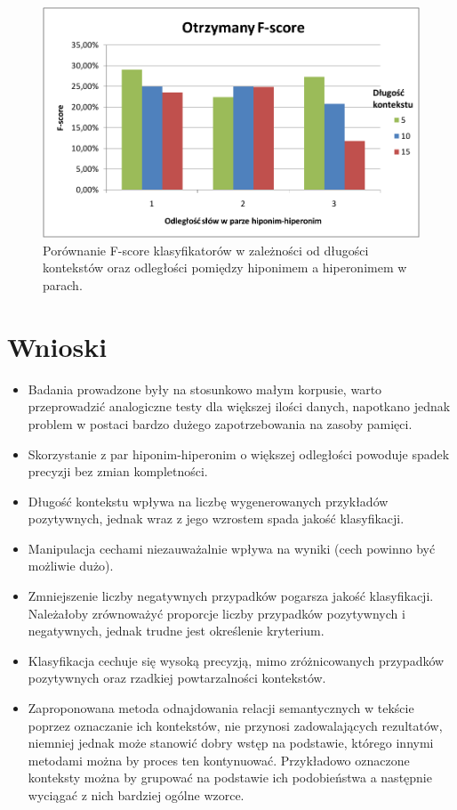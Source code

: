\documentclass[a4paper,10pt]{report}
\begin{document}
\begin{figure}[h]
\centering
 \includegraphics[width=13cm]{img/image001.png}
 \caption{Porównanie F-score klasyfikatorów w zależności od długości kontekstów oraz odległości pomiędzy hiponimem a hiperonimem w parach.}
\label{fig:wykres}
\end{figure} 

\section{Wnioski}


\begin{itemize}
  \item Badania prowadzone były na stosunkowo małym korpusie, warto przeprowadzić analogiczne testy dla większej ilości danych, napotkano jednak problem w postaci bardzo dużego zapotrzebowania na zasoby pamięci.
  \item Skorzystanie z par hiponim-hiperonim o większej odległości powoduje spadek precyzji bez zmian kompletności.
  \item Długość kontekstu wpływa na liczbę wygenerowanych przykładów pozytywnych, jednak wraz z jego wzrostem spada jakość klasyfikacji.
  \item Manipulacja cechami niezauważalnie wpływa na wyniki (cech powinno być możliwie dużo).
  \item Zmniejszenie liczby negatywnych przypadków pogarsza jakość klasyfikacji. Należałoby zrównoważyć proporcje liczby przypadków pozytywnych i negatywnych, jednak trudne jest określenie kryterium.
  \item Klasyfikacja cechuje się wysoką precyzją, mimo zróżnicowanych przypadków pozytywnych oraz rzadkiej powtarzalności kontekstów.
  \item Zaproponowana metoda odnajdowania relacji semantycznych w tekście poprzez oznaczanie ich kontekstów, nie przynosi zadowalających rezultatów, niemniej jednak może stanowić dobry wstęp na podstawie, którego innymi metodami można by proces ten kontynuować. Przykładowo oznaczone konteksty można by grupować na podstawie ich podobieństwa a następnie wyciągać z nich bardziej ogólne wzorce.
\end{itemize}
\end{document}
